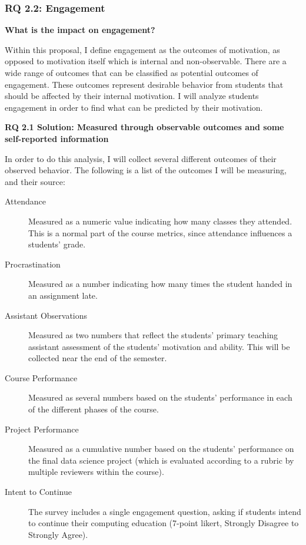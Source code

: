     \subsubsection{RQ 2.2: Engagement}
    
    \textbf{What is the impact on engagement?}
    
    Within this proposal, I define engagement as the outcomes of motivation, as opposed to motivation itself which is internal and non-observable.
    There are a wide range of outcomes that can be classified as potential outcomes of engagement. 
    These outcomes represent desirable behavior from students that should be affected by their internal motivation.
    I will analyze students engagement in order to find what can be predicted by their motivation.

    \textbf{RQ 2.1 Solution: Measured through observable outcomes and some self-reported information}
    
    In order to do this analysis, I will collect several different outcomes of their observed behavior.
    The following is a list of the outcomes I will be measuring, and their source:
    
    \begin{description}
    \item[Attendance] Measured as a numeric value indicating how many classes they attended. This is a normal part of the course metrics, since attendance influences a students' grade.
	\item[Procrastination] Measured as a number indicating how many times the student handed in an assignment late.
    \item[Assistant Observations] Measured as two numbers that reflect the students' primary teaching assistant assessment of the students' motivation and ability. This will be collected near the end of the semester.
    \item[Course Performance] Measured as several numbers based on the students' performance in each of the different phases of the course.
    \item[Project Performance] Measured as a cumulative number based on the students' performance on the final data science project (which is evaluated according to a rubric by multiple reviewers within the course).
    \item[Intent to Continue] The survey includes a single engagement question, asking if students intend to continue their computing education (7-point likert, Strongly Disagree to Strongly Agree).
    \end{description}
    
